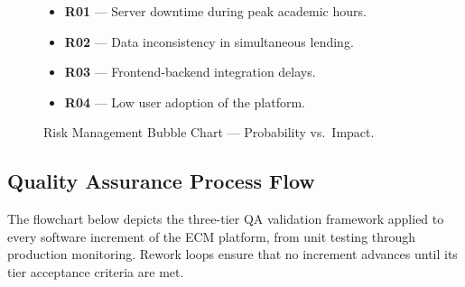 \documentclass[conference]{IEEEtran}
\begin{document}
\begin{figure}[h]
\vspace{0.1cm}
\begin{itemize}[noitemsep, leftmargin=1.0em, topsep=1pt]
  \item \scriptsize \textbf{R01} — Server downtime during peak academic hours.
  \item \scriptsize \textbf{R02} — Data inconsistency in simultaneous lending.
  \item \scriptsize \textbf{R03} — Frontend-backend integration delays.
  \item \scriptsize \textbf{R04} — Low user adoption of the platform.
\end{itemize}
\caption{Risk Management Bubble Chart — Probability vs.\ Impact.}
\label{fig:risk_matrix}
\end{figure}

\subsection{Quality Assurance Process Flow}
The flowchart below depicts the three-tier QA validation framework applied to every software increment of the ECM platform, from unit testing through production monitoring. Rework loops ensure that no increment advances until its tier acceptance criteria are met.
\end{document}
